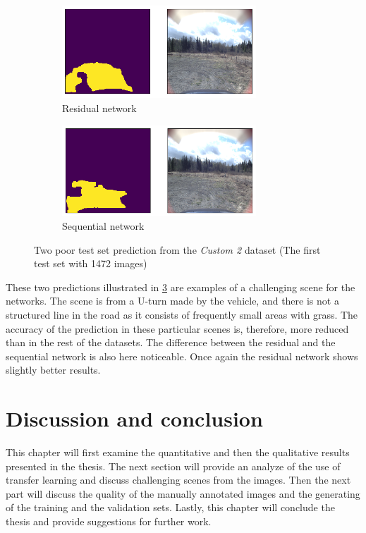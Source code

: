 \documentclass[USenglish]{ifimaster}  %
\begin{document}
\begin{figure}[ht]
\centering
\begin{subfigure}[b]{\textwidth}
\centering
\includegraphics[width=0.8\textwidth]{bilder/custom_2/154_res_poor.png}
\caption{Residual network}
\label{fig:custom_2_poor_res}
\end{subfigure}
\hfill
\begin{subfigure}[b]{\textwidth}
\centering
\includegraphics[width=0.8\textwidth]{bilder/custom_2/154_seq_poor.png}
\caption{Sequential network}
\label{fig:custom_2_poor_seq}
\end{subfigure}
\caption{Two poor test set prediction from the \textit{Custom 2} dataset (The first test set with 1472 images)}
\label{fig:custom_2_poor}
\end{figure}

These two predictions illustrated in \cref{fig:custom_2_poor} are examples of a challenging scene for the networks. The scene is from a U-turn made by the vehicle, and there is not a structured line in the road as it consists of frequently small areas with grass. The accuracy of the prediction in these particular scenes is, therefore, more reduced than in the rest of the datasets. The difference between the residual and the sequential network is also here noticeable. Once again the residual network shows slightly better results.


\chapter{Discussion and conclusion}\label{discussion}
This chapter will first examine the quantitative and then the qualitative results presented in the thesis. The next section will provide an analyze of the use of transfer learning and discuss challenging scenes from the images. Then the next part will discuss the quality of the manually annotated images and the generating of the training and the validation sets. Lastly, this chapter will conclude the thesis and provide suggestions for further work. 
\end{document}
